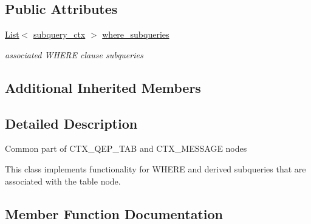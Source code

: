 \subsection*{Public Attributes}
\begin{DoxyCompactItemize}
\item 
\mbox{\label{classopt__explain__json__namespace_1_1table__with__where__and__derived_a5ce290042164a423e2d559377ec81f8d}} 
\mbox{\hyperlink{classList}{List}}$<$ \mbox{\hyperlink{classopt__explain__json__namespace_1_1subquery__ctx}{subquery\+\_\+ctx}} $>$ \mbox{\hyperlink{classopt__explain__json__namespace_1_1table__with__where__and__derived_a5ce290042164a423e2d559377ec81f8d}{where\+\_\+subqueries}}
\begin{DoxyCompactList}\small\item\em associated W\+H\+E\+RE clause subqueries \end{DoxyCompactList}\end{DoxyCompactItemize}
\subsection*{Additional Inherited Members}


\subsection{Detailed Description}
Common part of C\+T\+X\+\_\+\+Q\+E\+P\+\_\+\+T\+AB and C\+T\+X\+\_\+\+M\+E\+S\+S\+A\+GE nodes

This class implements functionality for W\+H\+E\+RE and derived subqueries that are associated with the table node. 

\subsection{Member Function Documentation}
\mbox{\label{classopt__explain__json__namespace_1_1table__with__where__and__derived_ab71bf926210b34494e172ff100cc348b}} 
